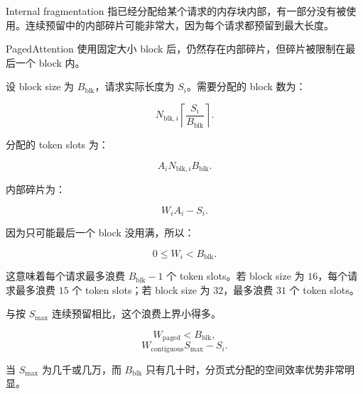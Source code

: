 Internal fragmentation 指已经分配给某个请求的内存块内部，有一部分没有被使用。连续预留中的内部碎片可能非常大，因为每个请求都预留到最大长度。

PagedAttention 使用固定大小 block 后，仍然存在内部碎片，但碎片被限制在最后一个 block 内。

设 block size 为 $B_{\mathrm{blk}}$，请求实际长度为 $S_i$。需要分配的 block 数为：

\[
N_{\mathrm{blk},i}
\left\lceil
\frac{S_i}{B_{\mathrm{blk}}}
\right\rceil.
\]

分配的 token slots 为：

\[
A_i
N_{\mathrm{blk},i}B_{\mathrm{blk}}.
\]

内部碎片为：

\[
W_i
A_i-S_i.
\]

因为只可能最后一个 block 没用满，所以：

\[
0\le W_i < B_{\mathrm{blk}}.
\]

这意味着每个请求最多浪费 $B_{\mathrm{blk}}-1$ 个 token slots。若 block size 为 $16$，每个请求最多浪费 $15$ 个 token slots；若 block size 为 $32$，最多浪费 $31$ 个 token slots。

与按 $S_{\max}$ 连续预留相比，这个浪费上界小得多。

\[
W_{\mathrm{paged}}
<
B_{\mathrm{blk}},
\]
\[
W_{\mathrm{contiguous}}
S_{\max}-S_i.
\]

当 $S_{\max}$ 为几千或几万，而 $B_{\mathrm{blk}}$ 只有几十时，分页式分配的空间效率优势非常明显。

